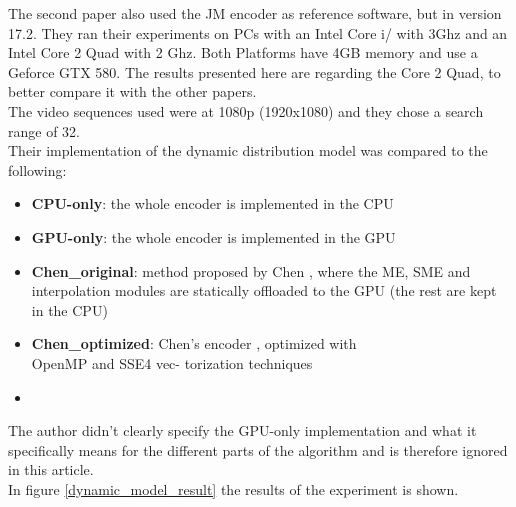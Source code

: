 The second paper \cite{Paper2} also used the JM encoder as reference software, but in version 17.2. They ran their experiments on PCs with an Intel Core i/ with 3Ghz and an Intel Core 2 Quad with 2 Ghz. Both Platforms have 4GB memory and use a Geforce GTX 580. The results presented here are regarding the Core 2 Quad, to better compare it with the other papers.\\
The video sequences used were at 1080p (1920x1080) and they chose a search range of 32.\\
Their implementation of the dynamic distribution model was compared to the following:\\
\begin{itemize}
\item \textbf{CPU-only}: the whole encoder is implemented in the CPU
\item \textbf{GPU-only}: the whole encoder is implemented in the GPU
\item \textbf{Chen\_original}: method proposed by Chen \cite{chen2008h}, where the ME, SME and
interpolation modules are statically offloaded to the GPU
(the rest are kept in the CPU)
\item \textbf{Chen\_optimized}: Chen's encoder \cite{chen2008h}, optimized with \\OpenMP and SSE4 vec-
torization techniques
\item  {}
\end{itemize}
The author didn't clearly specify the GPU-only implementation and  what it specifically means for the different parts of the algorithm and is therefore ignored in this article.\\
In figure \ref{dynamic_model_result} the results of the experiment is shown.

